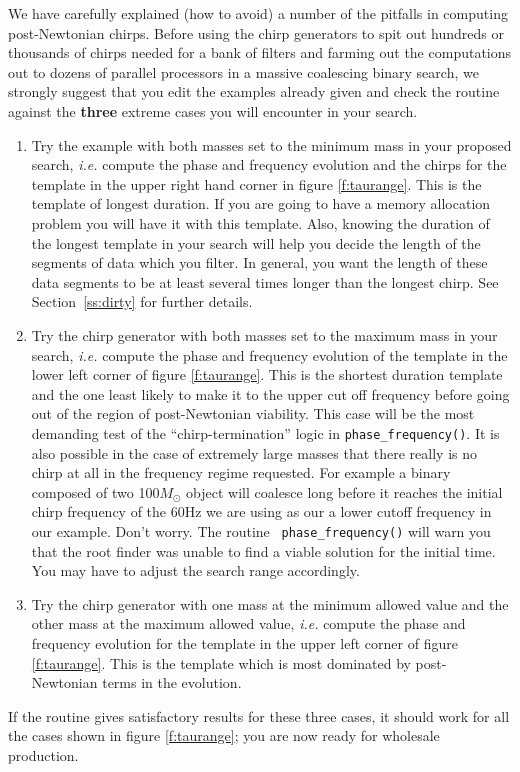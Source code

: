 We have carefully explained (how to avoid) 
a number of the pitfalls in computing post-Newtonian chirps.
Before using the chirp generators to
spit out hundreds or thousands of chirps needed for 
a bank of filters and farming out the computations out to dozens
of parallel processors in a massive coalescing binary search,
we strongly suggest that you edit the examples already given
and check the routine against
the {\bf three} extreme cases you will encounter in your search. 
\begin{enumerate}
\item
Try the example with both masses set to the minimum mass in your
proposed search, {\it i.e.} compute the phase and frequency evolution
and the chirps for the template in the upper right hand corner in
figure \ref{f:taurange}.  This is the template of longest duration. If
you are going to have a memory allocation problem you will have it with
this template.  Also, knowing the duration of the longest template
in your search will help you decide the length of the segments of
data which you filter.  In general, you want the length of these data
segments to be at least several times longer than the longest chirp.
See Section~\ref{ss:dirty} for further details.
\item
Try the chirp generator with both masses set to the maximum mass in
your search, {\it i.e.} compute the phase and frequency evolution
of the template in the lower left corner of figure \ref{f:taurange}.
This is the shortest duration template and the one least likely to make
it to the upper cut off frequency before going out of the region of
post-Newtonian viability.  This case will be the most demanding test
of the ``chirp-termination'' logic in {\tt phase\_frequency()}.  It is
also possible in the case of extremely large masses that there really
is no chirp at all in the frequency regime requested.  For example a
binary composed of two 100$M_\odot$ object will coalesce long before
it reaches the initial chirp frequency of the 60Hz we are using as our
a lower cutoff frequency in our example. Don't worry. The routine {\tt
phase\_frequency()} will warn you that the root finder was unable to
find a viable solution for the initial time.  You may have to adjust
the search range accordingly.
\item
Try the chirp generator with one mass at the minimum
allowed value and the other mass at the maximum allowed value,
{\it i.e.} compute the phase and frequency evolution for the template
in the upper left corner of figure \ref{f:taurange}.
This is the template which is
most dominated by post-Newtonian terms in the evolution.
\end{enumerate}
If the routine gives satisfactory results for these three 
cases, it should work for all the cases shown 
in figure \ref{f:taurange}; you are now ready for wholesale production.
\clearpage

